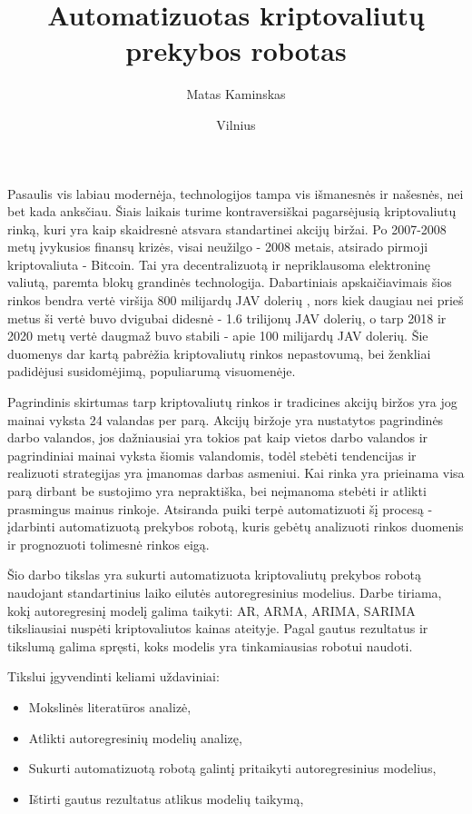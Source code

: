 \documentclass{VUMIFInfKursinis}
\institute{Informatikos institutas}  %
\title{Automatizuotas kriptovaliutų prekybos robotas}
\author{Matas Kaminskas}
\date{Vilnius \\ \the\year}
\begin{document}
\maketitle

\tableofcontents

Pasaulis vis labiau modernėja, technologijos tampa vis išmanesnės ir našesnės, nei bet kada anksčiau. Šiais laikais turime kontraversiškai pagarsėjusią
kriptovaliutų rinką, kuri yra kaip skaidresnė atsvara standartinei akcijų biržai. Po 2007-2008 metų įvykusios finansų krizės,
visai neužilgo - \cite{nakamoto2008bitcoin} 2008 metais, atsirado pirmoji kriptovaliuta - Bitcoin. Tai yra decentralizuotą ir nepriklausoma elektroninę valiutą, paremta
blokų grandinės technologija. Dabartiniais apskaičiavimais šios rinkos bendra vertė viršija 800 milijardų JAV dolerių \cite{CoinMarketCap},
nors kiek daugiau nei prieš metus ši vertė buvo dvigubai didesnė - 1.6 trilijonų JAV dolerių, o tarp 2018 ir 2020 metų vertė daugmaž buvo stabili - apie 100 milijardų JAV dolerių.
Šie duomenys dar kartą pabrėžia kriptovaliutų rinkos nepastovumą, bei ženkliai padidėjusi susidomėjimą, populiarumą visuomenėje.    


Pagrindinis skirtumas tarp kriptovaliutų rinkos ir tradicines akcijų biržos yra jog mainai vyksta 24 valandas per parą. Akcijų biržoje yra nustatytos pagrindinės darbo valandos,
jos dažniausiai yra tokios pat kaip vietos darbo valandos ir pagrindiniai mainai vyksta šiomis valandomis, todėl stebėti tendencijas ir realizuoti strategijas yra įmanomas darbas asmeniui.
Kai rinka yra prieinama visa parą dirbant be sustojimo yra nepraktiška, bei neįmanoma stebėti ir atlikti prasmingus mainus rinkoje. Atsiranda puiki terpė automatizuoti šį 
procesą - įdarbinti automatizuotą prekybos robotą, kuris gebėtų analizuoti rinkos duomenis ir prognozuoti tolimesnė rinkos eigą.


Šio darbo tikslas yra sukurti automatizuota kriptovaliutų prekybos robotą naudojant standartinius laiko eilutės autoregresinius modelius. 
Darbe tiriama, kokį autoregresinį modelį galima taikyti: AR, ARMA, ARIMA, SARIMA tiksliausiai nuspėti kriptovaliutos
kainas ateityje. Pagal gautus rezultatus ir tikslumą galima spręsti, koks modelis yra tinkamiausias robotui naudoti.


Tikslui įgyvendinti keliami uždaviniai:
\begin{itemize}
  \item Mokslinės literatūros analizė,
  \item Atlikti autoregresinių modelių analizę,
  \item Sukurti automatizuotą robotą galintį pritaikyti autoregresinius modelius,
  \item Ištirti gautus rezultatus atlikus modelių taikymą,
\end{itemize}
\end{document}
